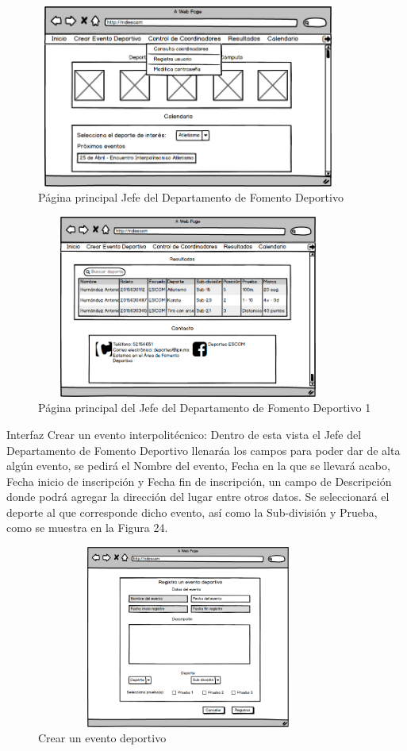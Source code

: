 	\pagebreak
	
	\begin{figure}[hbt!]
		\centering
		\includegraphics[width=10cm, height=6cm]{Imagenes/Disenos/p4InicioJefeFDopcipones.png}
		\caption{Página principal Jefe del Departamento de Fomento Deportivo}
	\end{figure}
	\begin{figure}[hbt!]
		\centering
		\includegraphics[width=10cm, height=6cm]{Imagenes/Disenos/p5InicioJefeFD1.png}
		\caption{Página principal del Jefe del Departamento de Fomento Deportivo 1}
	\end{figure}
	
	\noindent Interfaz Crear un evento interpolitécnico: Dentro de esta vista el Jefe del Departamento de Fomento Deportivo llenaráa los campos para poder dar de alta algún evento, se pedirá el Nombre del evento, Fecha en la que se llevará acabo, Fecha inicio de inscripción y Fecha fin de inscripción, un campo de Descripción donde podrá agregar la dirección del lugar entre otros datos. Se seleccionará el deporte al que corresponde dicho evento, así como la Sub-división y Prueba, como se muestra en la Figura 24.
	\pagebreak
	\begin{figure}[hbt!]
		\centering
		\includegraphics[width=10cm, height=6cm]{Imagenes/Disenos/p6Creareventodeportivo.png}
		\caption{Crear un evento deportivo}
	\end{figure}
	

